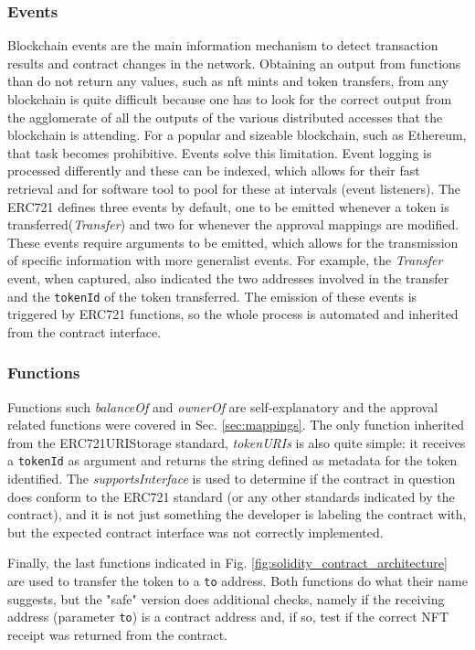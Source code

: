 \documentclass[../main.tex]{subfiles}
\begin{document}
\subsubsection{Events}
Blockchain events are the main information mechanism to detect transaction results and contract changes in the network. Obtaining an output from functions than do not return any values, such as nft mints and token transfers, from any blockchain is quite difficult because one has to look for the correct output from the agglomerate of all the outputs of the various distributed accesses that the blockchain is attending. For a popular and sizeable blockchain, such as Ethereum, that task becomes prohibitive. Events solve this limitation. Event logging is processed differently and these can be indexed, which allows for their fast retrieval and for software tool to pool for these at intervals (event listeners). The ERC721 defines three events by default, one to be emitted whenever a token is transferred(\textit{Transfer}) and two for whenever the approval mappings are modified. These events require arguments to be emitted, which allows for the transmission of specific information with more generalist events. For example, the \textit{Transfer} event, when captured, also indicated the two addresses involved in the transfer and the \verb|tokenId| of the token transferred. The emission of these events is triggered by ERC721 functions, so the whole process is automated and inherited from the contract interface.

\subsubsection{Functions}
Functions such \textit{balanceOf} and \textit{ownerOf} are self-explanatory and the approval related functions were covered in Sec. \ref{sec:mappings}. The only function inherited from the ERC721URIStorage standard, \textit{tokenURIs} is also quite simple: it receives a \verb|tokenId| as argument and returns the string defined as metadata for the token identified. The \textit{supportsInterface} is used to determine if the contract in question does conform to the ERC721 standard (or any other standards indicated by the contract), and it is not just something the developer is labeling the contract with, but the expected contract interface was not correctly implemented.
\par
Finally, the last functions indicated in Fig. \ref{fig:solidity_contract_architecture} are used to transfer the token to a \verb|to| address. Both functions do what their name suggests, but the "safe" version does additional checks, namely if the receiving address (parameter \verb|to|) is a contract address and, if so, test if the correct NFT receipt was returned from the contract.

\end{document}
